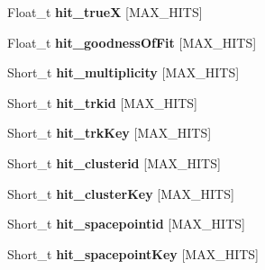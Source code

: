 \begin{DoxyCompactItemize}
\item 
\hypertarget{classanatree_ad5cc6743533ccea068d811f1fa49d758}{Float\-\_\-t {\bfseries hit\-\_\-true\-X} \mbox{[}M\-A\-X\-\_\-\-H\-I\-T\-S\mbox{]}}\label{classanatree_ad5cc6743533ccea068d811f1fa49d758}

\item 
\hypertarget{classanatree_acc1bb7eda8ed703f7a82271c52a92701}{Float\-\_\-t {\bfseries hit\-\_\-goodness\-Of\-Fit} \mbox{[}M\-A\-X\-\_\-\-H\-I\-T\-S\mbox{]}}\label{classanatree_acc1bb7eda8ed703f7a82271c52a92701}

\item 
\hypertarget{classanatree_af3f48ee718b6dfd61c5c5ae1fe1acb8a}{Short\-\_\-t {\bfseries hit\-\_\-multiplicity} \mbox{[}M\-A\-X\-\_\-\-H\-I\-T\-S\mbox{]}}\label{classanatree_af3f48ee718b6dfd61c5c5ae1fe1acb8a}

\item 
\hypertarget{classanatree_a19e0fec810b28a401972fd7325d425a4}{Short\-\_\-t {\bfseries hit\-\_\-trkid} \mbox{[}M\-A\-X\-\_\-\-H\-I\-T\-S\mbox{]}}\label{classanatree_a19e0fec810b28a401972fd7325d425a4}

\item 
\hypertarget{classanatree_a135da3dcaee773b249bb63a55d0c33a5}{Short\-\_\-t {\bfseries hit\-\_\-trk\-Key} \mbox{[}M\-A\-X\-\_\-\-H\-I\-T\-S\mbox{]}}\label{classanatree_a135da3dcaee773b249bb63a55d0c33a5}

\item 
\hypertarget{classanatree_a0bbe6efdbc01ccd0125f76a243670f31}{Short\-\_\-t {\bfseries hit\-\_\-clusterid} \mbox{[}M\-A\-X\-\_\-\-H\-I\-T\-S\mbox{]}}\label{classanatree_a0bbe6efdbc01ccd0125f76a243670f31}

\item 
\hypertarget{classanatree_abd61d26e2ae9d4b2880149d661fb7438}{Short\-\_\-t {\bfseries hit\-\_\-cluster\-Key} \mbox{[}M\-A\-X\-\_\-\-H\-I\-T\-S\mbox{]}}\label{classanatree_abd61d26e2ae9d4b2880149d661fb7438}

\item 
\hypertarget{classanatree_a3d5155aa8cb5f08e97495a5cfe4201b5}{Short\-\_\-t {\bfseries hit\-\_\-spacepointid} \mbox{[}M\-A\-X\-\_\-\-H\-I\-T\-S\mbox{]}}\label{classanatree_a3d5155aa8cb5f08e97495a5cfe4201b5}

\item 
\hypertarget{classanatree_a83b06a33d20b0fe07916050ad1c55426}{Short\-\_\-t {\bfseries hit\-\_\-spacepoint\-Key} \mbox{[}M\-A\-X\-\_\-\-H\-I\-T\-S\mbox{]}}\label{classanatree_a83b06a33d20b0fe07916050ad1c55426}


\end{DoxyCompactItemize}
